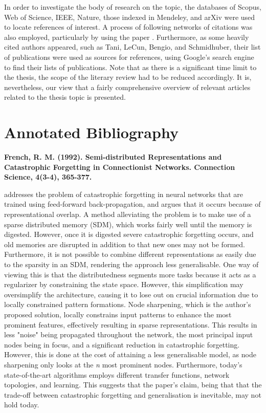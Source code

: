 In order to investigate the body of research on the topic, the databases of Scopus, Web of Science, IEEE, Nature, those indexed in Mendeley, and arXiv were used to locate references of interest. A process of following networks of citations was also employed, particularly by using the paper \cite{McClelland1995}. Furthermore, as some heavily cited authors appeared, such as Tani, LeCun, Bengio, and Schmidhuber, their list of publications were used as sources for references, using Google's search engine to find their lists of publications. Note that as there is a significant time limit to the thesis, the scope of the literary review had to be reduced accordingly. It is, nevertheless, our view that a fairly comprehensive overview of relevant articles related to the thesis topic is presented.

\section{Annotated Bibliography}

\textbf{French, R. M. (1992). Semi-distributed Representations and Catastrophic Forgetting in Connectionist Networks. Connection Science, 4(3-4), 365-377.}

\cite{French1992} addresses the problem of catastrophic forgetting \cite{McCloskey1989, Ratcliff1990} in neural networks that are trained using feed-forward back-propagation, and argues that it occurs because of representational overlap. A method alleviating the problem is to make use of a sparse distributed memory (SDM), which works fairly well until the memory is digested. However, once it is digested severe catastrophic forgetting occurs, and old memories are disrupted in addition to that new ones may not be formed. Furthermore, it is not possible to combine different representations as easily due to the sparsity in an SDM, rendering the approach less generalisable. One way of viewing this is that the distributedness segments more tasks because it acts as a regularizer by constraining the state space. However, this simplification may oversimplify the architecture, causing it to lose out on crucial information due to locally constrained pattern formations. Node sharpening, which is the author's proposed solution, locally constrains input patterns to enhance the most prominent features, effectively resulting in sparse representations. This results in less "noise" being propagated throughout the network, the most principal input nodes being in focus, and a significant reduction in catastrophic forgetting. However, this is done at the cost of attaining a less generalisable model, as node sharpening only looks at the \textit{n} most prominent nodes. Furthermore, today's state-of-the-art algorithms employs different transfer functions, network topologies, and learning. This suggests that the paper's claim, being that that the trade-off between catastrophic forgetting and generalisation is inevitable, may not hold today.


